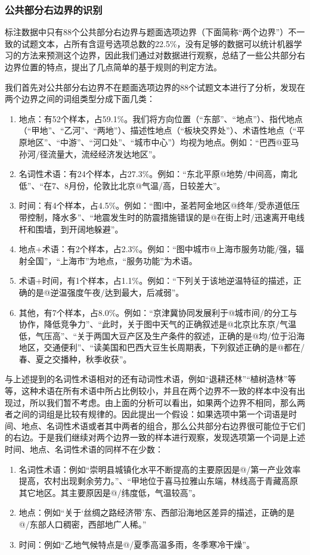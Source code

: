\documentclass[master, winfont]{njuthesis}
\begin{document}
\subsubsection{公共部分右边界的识别}
\label{boundary_rec}
标注数据中只有88个公共部分右边界与题面选项边界（下面简称“两个边界”）不一致的试题文本，占所有含逗号选项总数的22.5\%，没有足够的数据可以统计机器学习的方法来预测这个边界，因此我们通过对数据进行观察，总结了一些公共部分右边界位置的特点，提出了几点简单的基于规则的判定方法。

我们首先对公共部分右边界不在题面选项边界的88个试题文本进行了分析，发现在两个边界之间的词组类型分成下面几类：
\begin{enumerate}
	\item 地点：有52个样本，占59.1\%。我们将方向位置（“东部”、“地点”）、指代地点（“甲地”、“乙河”、“两地”）、描述性地点（“板块交界处”）、术语性地点（“平原地区”、“中游”、“河口处”、“城市中心”）均视为地点。例如：“巴西@亚马孙河/径流量大，流经经济发达地区”。
	\item 名词性术语：有24个样本，占27.3\%。例如：“东北平原@地势/中间高，南北低”、“在7、8月份，伦敦比北京@气温/高，日较差大”。
	\item 时间：有4个样本，占4.5\%。例如：“图l中，圣若阿金地区@终年/受赤道低压带控制，降水多”、“地震发生时的防震措施错误的是@在街上时/迅速离开电线杆和围墙，到开阔地躲避”。
	\item 地点+术语：有2个样本，占2.3\%。例如：“图中城市@上海市服务功能/强，辐射全国”，“上海市”为地点，“服务功能”为术语。
	\item 术语+时间，有1个样本，占1.1\%。例如：“下列关于该地逆温特征的描述，正确的是@逆温强度午夜/达到最大，后减弱”。
	\item 其他，有7个样本，占8.0\%。例如：“京津冀协同发展利于@城市间/的分工与协作，降低竞争力”、“此时，关于图中天气的正确叙述是@北京比东京/气温低，气压高”、“关于两国大豆产区及生产条件的叙述，正确的是@均/位于沿海地区，交通便利”、“读美国和巴西大豆生长周期表，下列叙述正确的是@都在/春、夏之交播种，秋季收获”。
\end{enumerate}

与上述提到的名词性术语相对的还有动词性术语，例如“退耕还林”“植树造林”等等，这种术语在所有术语中所占比例较小，并且在两个边界不一致的样本中没有出现过，所以我们暂不考虑。由上面的分析可以看出，如果两个边界不相同，那么两者之间的词组是比较有规律的。因此提出一个假设：如果选项中第一个词语是时间、地点、名词性术语或者其中两者的组合，那么公共部分右边界很可能位于它们的右边。于是我们继续对两个边界一致的样本进行观察，发现选项第一个词是上述时间、地点、名词性术语的同样不在少数：
\begin{enumerate}
	\item 名词性术语：例如“崇明县城镇化水平不断提高的主要原因是@/第一产业效率提高，农村出现剩余劳力。”、“甲地位于喜马拉雅山东端，林线高于青藏高原其它地区。其主要原因是@/纬度低，气温较高”。
	\item 地点：例如“关于‘丝绸之路经济带’东、西部沿海地区差异的描述，正确的是@/东部人口稠密，西部地广人稀。”
	\item 时间：例如“乙地气候特点是@/夏季高温多雨，冬季寒冷干燥”。
\end{enumerate}
\end{document}
